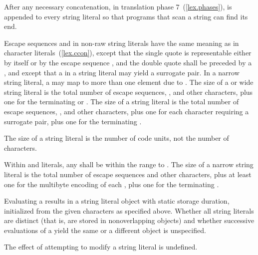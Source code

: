 \pnum
{}%
%
%
After any necessary concatenation, in translation phase
7~(\ref{lex.phases}),  is appended to every
string literal so that programs that scan a string can find its end.

\pnum
{}%
Escape sequences and  in non-raw string literals
have the same meaning as in character literals~(\ref{lex.ccon}), except that
the single quote  is representable either by itself or by the escape sequence
, and the double quote  shall be preceded by a
\tcode{\textbackslash},
and except that a  in a
 string literal may yield a surrogate pair.
%
In a narrow string literal, a  may map to more
than one  element due to . The
size of a  or wide string literal is the total number of
escape sequences, , and other characters, plus
one for the terminating  or
. The size of a  string
literal is the total number of escape sequences,
, and other characters, plus one for each
character requiring a surrogate pair, plus one for the terminating
. \begin{note} The size of a 
string literal is the number of code units, not the number of
characters. \end{note} Within  and 
literals, any  shall be within the range
 to . The size of a narrow string literal is
the total number of escape sequences and other characters, plus at least
one for the multibyte encoding of each , plus
one for the terminating .

\pnum
Evaluating a  results in a string literal object
with static storage duration, initialized from the given characters as
specified above.
%
Whether all string literals are distinct (that is, are stored in
nonoverlapping objects) and whether successive evaluations of a
 yield the same or a different object is
unspecified.
\begin{note}
%
The effect of attempting to modify a string literal is undefined. \end{note}

